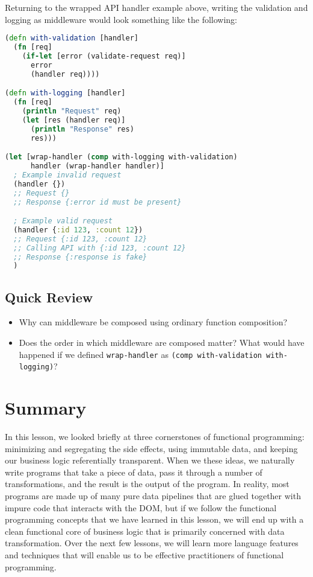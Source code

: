 \documentclass[10pt,twoside,openright]{memoir}
\begin{document}
Returning to the wrapped API handler example above, writing the
validation and logging as middleware would look something like the
following:

\begin{lstlisting}[language=Clojure]
(defn with-validation [handler]
  (fn [req]
    (if-let [error (validate-request req)]
      error
      (handler req))))

(defn with-logging [handler]
  (fn [req]
    (println "Request" req)
    (let [res (handler req)]
      (println "Response" res)
      res)))

(let [wrap-handler (comp with-logging with-validation)
      handler (wrap-handler handler)]
  ; Example invalid request
  (handler {})
  ;; Request {}
  ;; Response {:error id must be present}

  ; Example valid request
  (handler {:id 123, :count 12})
  ;; Request {:id 123, :count 12}
  ;; Calling API with {:id 123, :count 12}
  ;; Response {:response is fake}
  )
\end{lstlisting}


\subsection{Quick Review}

\begin{itemize}
\tightlist
\item
  Why can middleware be composed using ordinary function composition?
\item
  Does the order in which middleware are composed matter? What would
  have happened if we defined \texttt{wrap-handler} as
  \texttt{(comp\ with-validation\ with-logging)}?
\end{itemize}


\section{Summary}

In this lesson, we looked briefly at three cornerstones of functional
programming: minimizing and segregating the side effects, using
immutable data, and keeping our business logic referentially
transparent. When we these ideas, we naturally write programs that take
a piece of data, pass it through a number of transformations, and the
result is the output of the program. In reality, most programs are made
up of many pure data pipelines that are glued together with impure code
that interacts with the DOM, but if we follow the functional programming
concepts that we have learned in this lesson, we will end up with a
clean functional core of business logic that is primarily concerned with
data transformation. Over the next few lessons, we will learn more
language features and techniques that will enable us to be effective
practitioners of functional programming.
\end{document}
